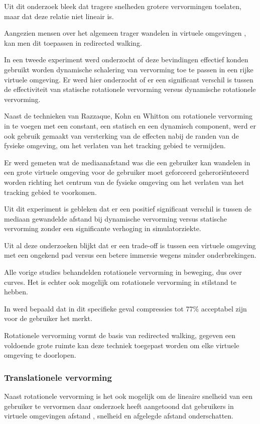 \documentclass[a4paper,12pt]{article}
\begin{document}
Uit dit onderzoek bleek dat tragere snelheden grotere vervormingen toelaten, maar
dat deze relatie niet lineair is.

Aangezien mensen over het algemeen trager wandelen in virtuele omgevingen
\cite{mohler07}, kan men dit toepassen in redirected walking.

In een tweede experiment \cite{neth12} werd onderzocht of deze bevindingen
effectief konden gebruikt worden dynamische schalering van vervorming toe te
passen in een rijke virtuele omgeving. Er werd hier onderzocht of er een
significant verschil is tussen de effectiviteit van statische rotationele
vervorming versus dynamische rotationele vervorming.

Naast de technieken van Razzaque, Kohn en Whitton \cite{kohn01} om rotationele
vervorming in te voegen met een constant, een statisch en een dynamisch component,
werd er ook gebruik gemaakt van versterking van de effecten nabij de randen van
de fysieke omgeving, om het verlaten van het tracking gebied te vermijden.

Er werd gemeten wat de mediaanafstand was die een gebruiker kan wandelen in een
grote virtuele omgeving voor de gebruiker moet geforceerd geherori\"enteeerd
worden richting het centrum van de fysieke omgeving om het verlaten van het
tracking gebied te voorkomen.

Uit dit experiment is gebleken dat er een positief significant verschil is tussen
de mediaan gewandelde afstand bij dynamische vervorming versus statische
vervorming zonder een significante verhoging in simulatorziekte.

Uit al deze onderzoeken blijkt dat er een trade-off is tussen een virtuele 
omgeving met een ongekend pad\cite{neth12} versus een betere immersie wegens 
minder onderbrekingen\cite{engel08,kohn01}. 

Alle vorige studies behandelden rotationele vervorming in beweging, dus over 
curves. Het is echter ook mogelijk om rotationele vervorming in stilstand te
hebben.

In \cite{steinicke09} werd bepaald dat in dit specifieke geval compressies tot
77\% acceptabel zijn voor de gebruiker het merkt.

Rotationele vervorming vormt de basis van redirected walking, gegeven een
voldoende grote ruimte kan deze techniek toegepast worden om elke virtuele
omgeving te doorlopen.


\subsubsection{Translationele vervorming}
Naast rotationele vervorming is het ook mogelijk om de lineaire snelheid van een
gebruiker te vervormen daar onderzoek heeft aangetoond dat gebruikers in virtuele
omgevingen afstand \cite{loomis03}, snelheid \cite{banton05} en afgelegde afstand
\cite{frenz07} onderschatten.
\end{document}
